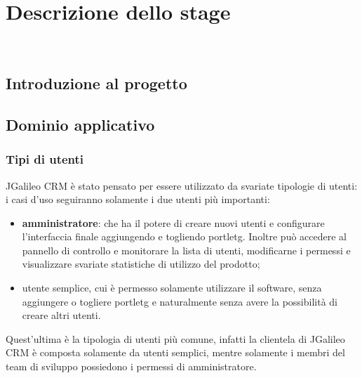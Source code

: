 
\chapter{Descrizione dello stage}
\label{cap:descrizione-stage}

\\

\section{Introduzione al progetto}

\section{Dominio applicativo}
\subsection{Tipi di utenti}
JGalileo CRM è stato pensato per essere utilizzato da svariate tipologie di utenti:
i casi d'uso seguiranno solamente i due utenti più importanti:
\begin{itemize}
	\item \textbf{amministratore}: che ha il potere di creare nuovi utenti e configurare l'interfaccia finale aggiungendo e togliendo \gls{portletg}. Inoltre può accedere al pannello di controllo e monitorare la lista di utenti, modificarne i permessi e visualizzare svariate statistiche di utilizzo del prodotto;
	\item{utente semplice}, cui è permesso solamente utilizzare il software, senza aggiungere o togliere \gls{portletg} e naturalmente senza avere la possibilità di creare altri utenti.\\
\end{itemize}
	Quest'ultima è la tipologia di utenti più comune, infatti la clientela di JGalileo CRM è composta solamente da utenti semplici, mentre solamente i membri del team di sviluppo possiedono i permessi di amministratore.
